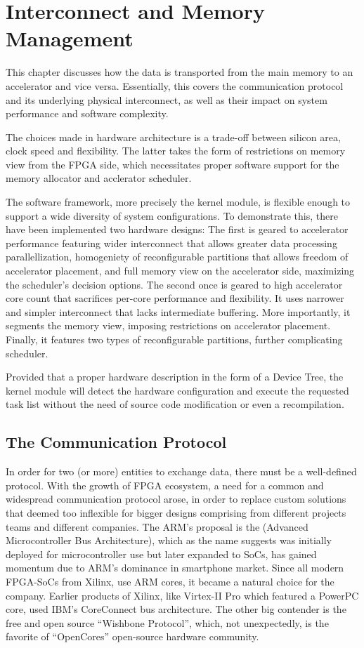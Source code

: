 \chapter{Interconnect and Memory Management}

This chapter discusses how the data is transported from the main memory to an accelerator and vice versa. 
Essentially, this covers the communication protocol and its underlying physical interconnect, 
as well as their impact on system performance and software complexity.

The choices made in hardware architecture is a trade-off between silicon area, clock speed and flexibility. 
The latter takes the form of restrictions on memory view from the FPGA side, 
which necessitates proper software support for the memory allocator and acclerator scheduler.

The software framework, more precisely the kernel module,
is flexible enough to support a wide diversity of system configurations. 
To demonstrate this, there have been implemented two hardware designs: 
The first is geared to accelerator performance featuring wider interconnect that 
allows greater data processing parallellization,
homogeniety of reconfigurable partitions that allows freedom of accelerator placement, 
and full memory view on the accelerator side, maximizing the scheduler's decision options.
The second once is geared to high accelerator core count that sacrifices per-core performance and flexibility. 
It uses narrower and simpler interconnect that lacks intermediate buffering. 
More importantly, it segments the memory view, 
imposing restrictions on accelerator placement. 
Finally, it features two types of reconfigurable partitions,
further complicating scheduler.

Provided that a proper hardware description in the form of a Device Tree\cite{devicetree}, 
the kernel module will detect the hardware configuration and execute the requested task list 
without the need of source code modification or even a recompilation.

\section{The Communication Protocol}
In order for two (or more) entities to exchange data, there must be a well-defined protocol.
With the growth of FPGA ecosystem, a need for a common and widespread communication protocol arose,
in order to replace custom solutions that deemed too inflexible for bigger designs comprising 
from different projects teams and different companies.
The ARM's proposal is the \cite{amba} (Advanced Microcontroller Bus Architecture), 
which as the name suggests was initially deployed for microcontroller use but later expanded to SoCs,
has gained momentum due to ARM's dominance in smartphone market. Since all modern FPGA-SoCs from Xilinx,
use ARM cores, it became a natural choice for the company. 
Earlier products of Xilinx, like Virtex-II Pro which
featured a PowerPC core, used IBM's CoreConnect bus architecture. 
The other big contender is the free and open source ``Wishbone Protocol'', 
which, not unexpectedly, is the favorite of ``OpenCores'' open-source hardware community.

